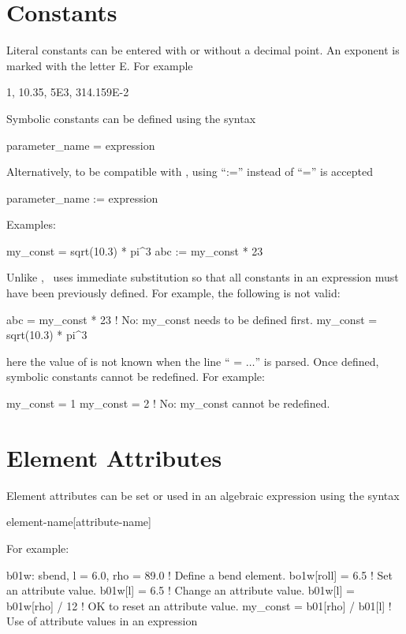 \section{Constants}

Literal constants can be entered with or without a decimal point. An
exponent is marked with the letter E. For example
\begin{example}
  1, 10.35, 5E3, 314.159E-2
\end{example}
Symbolic constants can be defined using the syntax
\begin{example}
  parameter_name = expression
\end{example}
Alternatively, to be compatible with \mad, using ``:='' instead of ``='' is accepted
\begin{example}
  parameter_name := expression
\end{example}
Examples:
\begin{example}
  my_const = sqrt(10.3) * pi^3
  abc     := my_const * 23
\end{example}
Unlike \mad, \bmad\ uses immediate substitution so that all constants
in an expression must have been previously defined. For example, the
following is not valid:
\begin{example}
  abc      = my_const * 23      ! No: my_const needs to be defined first.
  my_const = sqrt(10.3) * pi^3
\end{example}
here the value of  is not known when the line ``
= $\ldots$'' is parsed. Once
defined, symbolic constants cannot be redefined. For example:
\begin{example}
  my_const = 1
  my_const = 2  ! No: my_const cannot be redefined.
\end{example}


\section{Element Attributes}

Element attributes can be set or used in an algebraic expression
using the syntax
\begin{example}
  element-name[attribute-name]
\end{example}
For example:
\begin{example}
  b01w: sbend, l = 6.0, rho = 89.0   ! Define a bend element.
  bo1w[roll] = 6.5                   ! Set an attribute value.
  b01w[l] = 6.5                      ! Change an attribute value.
  b01w[l] = b01w[rho] / 12           ! OK to reset an attribute value.
  my_const = b01[rho] / b01[l]       ! Use of attribute values in an expression
\end{example}


